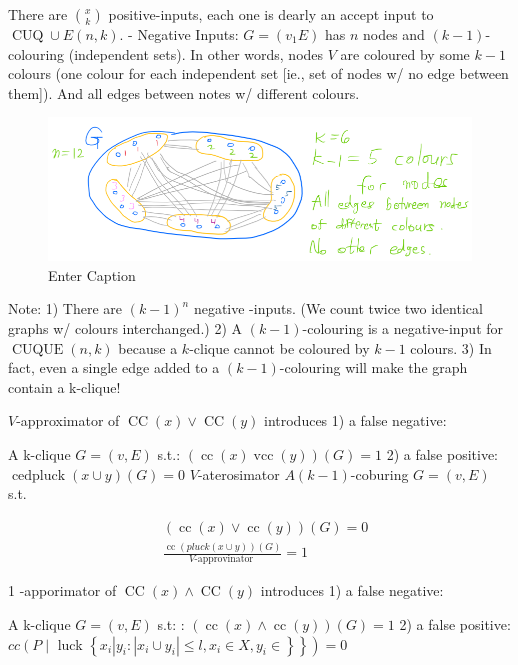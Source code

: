There are $\binom{x}{k}$ positive-inputs, each one is dearly an accept input to $\operatorname{CUQ} \cup E(n, k)$.
- Negative Inputs: $G=\left(v_1 E\right)$ has $n$ nodes and $(k-1)$-colouring (independent sets). In other words, nodes $V$ are coloured by some $k-1$ colours (one colour for each independent set [ie., set of nodes w/ no edge between them]). And all edges between notes w/ different colours.



\begin{figure}[H]
    \centering
    \includegraphics[width=.6\linewidth]{images/clique2.png}
    \caption{Enter Caption}
    \label{fig:enter-label}
\end{figure}



Note: 1) There are $(k-1)^n$ negative -inputs. (We count twice two identical graphs w/ colours interchanged.)
2) A $(k-1)$-colouring is a negative-input for $\operatorname{CUQUE}(n, k)$ because a $k$-clique cannot be coloured by $k-1$ colours.
3) In fact, even a single edge added to a $(k-1)$-colouring will make the graph contain a k-clique!




$V$-approximator of $\operatorname{CC}(x) \vee \operatorname{CC}(y)$ introduces
1) a false negative:

A k-clique $G=(v, E)$ s.t.: $(\operatorname{cc}(x) \operatorname{vcc}(y))(G)=1$
2) a false positive:
$\operatorname{cedpluck}(x \cup y)(G)=0$
$V$-aterosimator
$A(k-1)$-coburing $G=(v, E)$ s.t.

$$
\begin{aligned}
& (\operatorname{cc}(x) \vee \operatorname{cc}(y))(G)=0 \\
& \frac{\operatorname{cc}(p l u c k(x \cup y))(G)}{V \text {-approvinator }}=1
\end{aligned}
$$


1 -apporimator of $\operatorname{CC}(x) \wedge \operatorname{CC}(y)$ introduces
1) a false negative:

A k-clique $G=(v, E)$ s.t: : $(\operatorname{cc}(x) \wedge \operatorname{cc}(y))(G)=1$
2) a false positive: $c c\left(P \mid\right.$ luck $\left.\left\{x_i\left|y_i:\left|x_i \cup y_i\right| \leq l, x_i \in X, y_i \in\right\}\right\}\right)=0$

